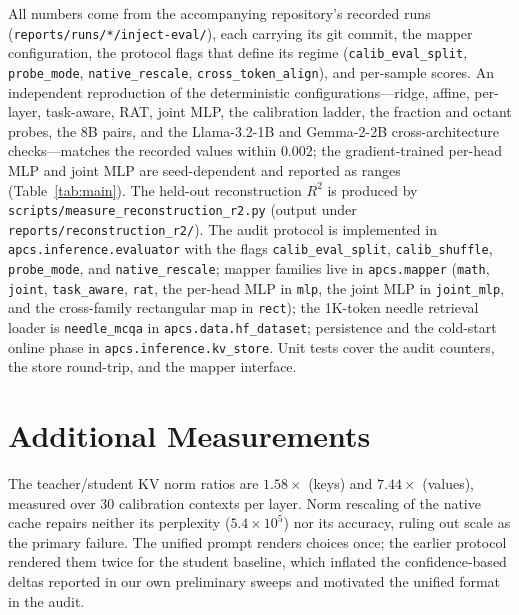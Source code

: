\documentclass[10pt]{article}
\begin{document}
All numbers come from the accompanying repository's recorded runs
(\texttt{reports/runs/*/inject-eval/}), each carrying its git commit, the
mapper configuration, the protocol flags that define its regime
(\texttt{calib\_eval\_\allowbreak split}, \texttt{probe\_mode},
\texttt{native\_\allowbreak rescale},
\texttt{cross\_\allowbreak token\_\allowbreak align}), and per-sample scores. An independent
reproduction of the deterministic configurations---ridge, affine, per-layer,
task-aware, RAT, joint MLP, the calibration ladder, the fraction and octant
probes, the 8B pairs, and the Llama-3.2-1B and Gemma-2-2B cross-architecture
checks---matches the recorded values within
$0.002$; the gradient-trained per-head MLP and joint MLP are seed-dependent and
reported as ranges (Table~\ref{tab:main}). The held-out
reconstruction $R^2$ is produced by \texttt{scripts/measure\_reconstruction\_r2.py}
(output under \texttt{reports/reconstruction\_r2/}). The audit protocol
is implemented in \texttt{apcs.\allowbreak inference.\allowbreak evaluator}
with the flags
\texttt{calib\_eval\_\allowbreak split}, \texttt{calib\_shuffle},
\texttt{probe\_mode},
and \texttt{native\_\allowbreak rescale}; mapper families live in
\texttt{apcs.\allowbreak mapper}
(\texttt{math}, \texttt{joint}, \texttt{task\_\allowbreak aware}, \texttt{rat}, the
per-head MLP in \texttt{mlp}, the joint MLP in \texttt{joint\_\allowbreak mlp}, and the
cross-family rectangular map in \texttt{rect}); the
1K-token needle retrieval loader is \texttt{needle\_\allowbreak mcqa} in
\texttt{apcs.\allowbreak data.\allowbreak hf\_\allowbreak dataset};
persistence and the cold-start online phase in
\texttt{apcs.inference.kv\_store}. Unit tests cover the audit counters, the
store round-trip, and the mapper interface.

\section{Additional Measurements}
The teacher/student KV norm ratios are $1.58\times$ (keys) and $7.44\times$
(values), measured over 30 calibration contexts per layer. Norm rescaling of
the native cache repairs neither its perplexity ($5.4\times10^{5}$) nor its
accuracy, ruling out scale as the primary failure. The unified prompt
renders choices once; the earlier protocol rendered them twice for the
student baseline, which inflated the confidence-based deltas reported in our
own preliminary sweeps and motivated the unified format in the audit.
\end{document}
